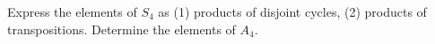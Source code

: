 Express the elements of $S_4$ as (1) products of disjoint cycles, (2) products of transpositions. Determine the elements of $A_4$.
